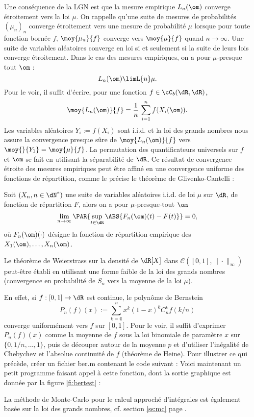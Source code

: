 Une conséquence de la LGN est que la mesure empirique $L_n(\om)$ converge
étroitement vers la loi $\mu$. On rappelle qu'une suite de mesures de
probabilités $(\mu_n)_n$ converge étroitement vers une mesure de probabilité
$\mu$ lorsque pour toute fonction bornée $f$, $\moy{\mu_n}{f}$ converge vers
$\moy{\mu}{f}$ quand $n\to\infty$.  Une suite de variables aléatoires converge
en loi si et seulement si la suite de leurs lois converge étroitement. Dans le
cas des mesures empiriques, on a pour $\mu$-presque tout $\om$ :
$$
L_n(\om)\limL{n}\mu.
$$
Pour le voir, il suffit d'écrire, pour une fonction $f\in\cC_b(\dR,\dR)$,
$$
\moy{L_n(\om)}{f}=\frac{1}{n}\,\sum_{i=1}^n f(X_i(\om)).
$$
Les variables aléatoires $Y_i:=f(X_i)$ sont i.i.d. et la loi des grands
nombres nous assure la convergence presque sûre de $\moy{L_n(\om)}{f}$ vers
$\moy{}{Y_1}=\moy{\mu}{f}$. La permutation des quantificateurs universels sur
$f$ et $\om$ se fait en utilisant la séparabilité de $\dR$. Ce résultat de
convergence étroite des mesures empiriques peut être affiné en une convergence
uniforme des fonctions de répartition, comme le précise le théorème de
Glivenko-Cantelli :

\begin{thm}\label{th:gc}
  Soit $(X_n,n\in\dN^*)$ une suite de variables aléatoires i.i.d. de loi $\mu$
  sur $\dR$, de fonction de répartition $F$, alors on a pour
  $\mu$-presque-tout $\om$
 \begin{equation}\label{eq:gc} 
 \lim_{n\to\infty} \PAR{\sup_{t \in \dR} \ABS{F_n(\om)(t)-F(t)}} = 0, 
\end{equation}
où $F_n(\om)(\cdot)$ désigne la fonction de répartition empirique des
$X_1(\om),\ldots,X_n(\om)$.
\end{thm}

\begin{exo}
  
  Le théorème de Weierstrass sur la densité de $\dR[X]$ dans
  $\mathcal{C}([0,1],\|\cdot\|_\infty)$ peut-être établi en utilisant une
  forme faible de la loi des grands nombres (convergence en probabilité de
  $S_n$ vers la moyenne de la loi $\mu$).
  
  En effet, si $f:[0,1]\to \dR$ est continue, le polynôme de Bernstein
  $$
  P_n(f)(x):=\sum_{k=0}^n x^k(1-x)^kC_n^k f(k/n)
  $$
  converge uniformément vers $f$ sur $[0,1]$. Pour le voir, il suffit
  d'exprimer $P_n(f)(x)$ comme la moyenne de $f$ sous la loi binomiale de
  paramètre $x$ sur $\{0,1/n,\ldots,1\}$, puis de découper autour de la
  moyenne $p$ et d'utiliser l'inégalité de Chebychev et l'absolue continuité
  de $f$ (théorème de Heine).  Pour illustrer ce qui précède, créer un fichier
  \textsf{ber.m} contenant le code suivant :
  Voici maintenant un petit programme faisant appel à cette fonction, dont la
  sortie graphique est donnée par la figure \ref{fi:bertest} :
\end{exo}
La méthode de Monte-Carlo pour le calcul approché d'intégrales est également
basée sur la loi des grands nombres, cf. section \ref{ss:mc} page
\pageref{ss:mc}.

